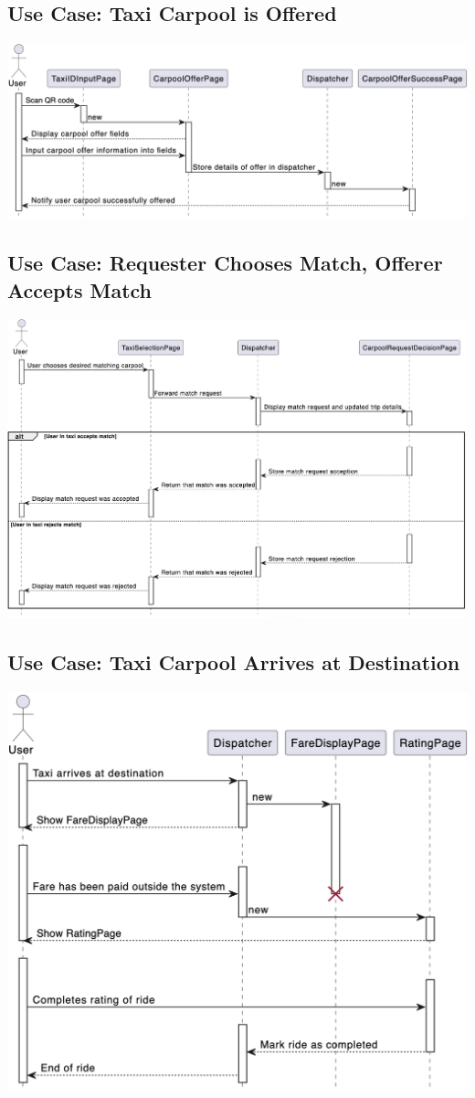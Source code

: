 \documentclass[]{article}
\begin{document}
\subsection*{Use Case: Taxi Carpool is Offered}
\includegraphics[scale=0.45]{Sequence Diagrams/GS5.png}

\subsection*{Use Case: Requester Chooses Match, Offerer Accepts Match}
\includegraphics[scale=0.45]{Sequence Diagrams/GS8.png}

\subsection*{Use Case: Taxi Carpool Arrives at Destination}
\includegraphics[scale=0.45]{Sequence Diagrams/GS6.png}
\end{document}
